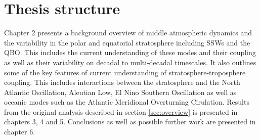 \section{Thesis structure}
Chapter 2 presents a background overview of middle atmospheric dynamics and the variability in the polar and equatorial stratosphere including SSWs and the QBO. This includes the current understanding of these modes and their coupling as well as their variability on decadal to multi-decadal timescales. It also outlines some of the key features of current understanding of stratosphere-troposphere coupling. This includes interactions between the stratosphere and the North Atlantic Oscillation, Aleutian Low, El Nino Southern Oscillation as well as oceanic modes such as the Atlantic Meridional Overturning Cirulation. Results from the original analysis described in section \ref{sec:overview} is presented in chapters 3, 4 and 5. Conclusions as well as possible further work are presented in chapter 6.








